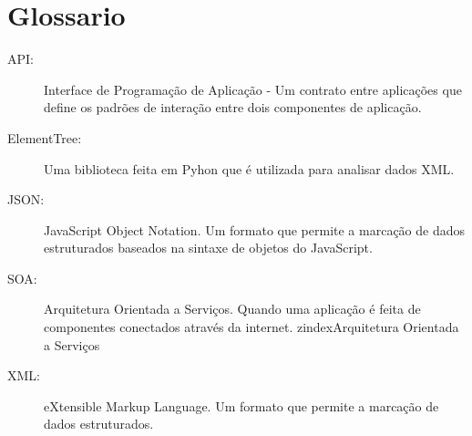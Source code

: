 \section{Glossario}

\begin{description}

\item[API:] Interface de Programação de Aplicação - Um contrato entre
aplicações que define os padrões de interação entre dois componentes
de aplicação.

\item[ElementTree:] Uma biblioteca feita em Pyhon que é utilizada para
analisar dados XML.
\index[ElementTree]

\item[JSON:] JavaScript Object Notation. Um formato que permite a
marcação de dados estruturados baseados na sintaxe de objetos do
JavaScript.

\item[SOA:]  Arquitetura Orientada a Serviços. Quando uma aplicação
é feita de componentes conectados através da internet.
zindex{Arquitetura Orientada a Serviços}

\item[XML:] eXtensible Markup Language. Um formato que permite a
marcação de dados estruturados.

\end{description}

